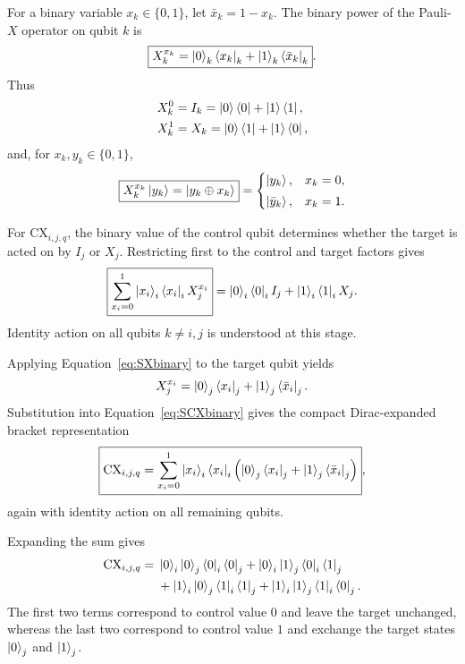 \documentclass[11pt,a4paper]{article}
\newcommand{\CX}{\mathrm{CX}}
\begin{document}
For a binary variable $x_k\in\{0,1\}$, let $\bar{x}_k=1-x_k$.  The binary power of the Pauli-$X$ operator on qubit $k$ is
\begin{equation}
\boxed{
X_k^{x_k}=\ket{0}_k\bra{x_k}_k+\ket{1}_k\bra{\bar{x}_k}_k
}.
\label{eq:SXbinary}
\end{equation}
Thus
\begin{align}
X_k^0&=I_k=\ket{0}\bra{0}+\ket{1}\bra{1},\\
X_k^1&=X_k=\ket{0}\bra{1}+\ket{1}\bra{0},
\end{align}
and, for $x_k,y_k\in\{0,1\}$,
\begin{equation}
\boxed{X_k^{x_k}\ket{y_k}=\ket{y_k\oplus x_k}}
=
\begin{cases}
\ket{y_k},&x_k=0,\\[1mm]
\ket{\bar{y}_k},&x_k=1.
\end{cases}
\label{eq:SXaction}
\end{equation}

For $\CX_{i,j,q}$, the binary value of the control qubit determines whether the target is acted on by $I_j$ or $X_j$.  Restricting first to the control and target factors gives
\begin{equation}
\boxed{
\sum_{x_i=0}^{1}\ket{x_i}_i\bra{x_i}_i X_j^{x_i}
}
=
\ket{0}_i\bra{0}_iI_j+\ket{1}_i\bra{1}_iX_j.
\label{eq:SCXbinary}
\end{equation}
Identity action on all qubits $k\neq i,j$ is understood at this stage.

Applying Equation~\eqref{eq:SXbinary} to the target qubit yields
\begin{equation}
X_j^{x_i}=\ket{0}_j\bra{x_i}_j+\ket{1}_j\bra{\bar{x}_i}_j.
\label{eq:SXtarget}
\end{equation}
Substitution into Equation~\eqref{eq:SCXbinary} gives the compact Dirac-expanded bracket representation
\begin{equation}
\boxed{
\CX_{i,j,q}
=
\sum_{x_i=0}^{1}
\ket{x_i}_i\bra{x_i}_i
\left(
\ket{0}_j\bra{x_i}_j
+
\ket{1}_j\bra{\bar{x}_i}_j
\right)
},
\label{eq:SCXdirac}
\end{equation}
again with identity action on all remaining qubits.

Expanding the sum gives
\begin{align}
\CX_{i,j,q}
={}&
\ket{0}_i\ket{0}_j\bra{0}_i\bra{0}_j
+
\ket{0}_i\ket{1}_j\bra{0}_i\bra{1}_j
\nonumber\\
&+
\ket{1}_i\ket{0}_j\bra{1}_i\bra{1}_j
+
\ket{1}_i\ket{1}_j\bra{1}_i\bra{0}_j.
\label{eq:SCXfour}
\end{align}
The first two terms correspond to control value $0$ and leave the target unchanged, whereas the last two correspond to control value $1$ and exchange the target states $\ket{0}_j$ and $\ket{1}_j$.
\end{document}
